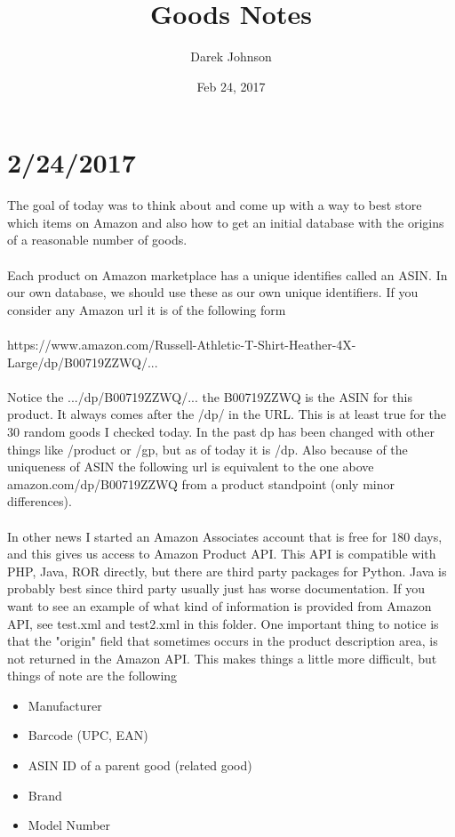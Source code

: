 \documentclass[12pt]{article}
\title{Goods Notes}
\author{Darek Johnson}
\date{Feb 24, 2017}
\begin{document}

\maketitle

\section*{2/24/2017}
The goal of today was to think about and come up with a way to best store which items on Amazon and also how to get an initial database with the origins of a reasonable number of goods. \\\\
Each product on Amazon marketplace has a unique identifies called an ASIN. In our own database, we should use these as our own unique identifiers. If you consider any Amazon url it is of the following form\\\\
https://www.amazon.com/Russell-Athletic-T-Shirt-Heather-4X-Large/dp/B00719ZZWQ/... \\\\
Notice the .../dp/B00719ZZWQ/... the B00719ZZWQ is the ASIN for this product. It always comes after the /dp/ in the URL. This is at least true for the 30 random goods I checked today. In the past dp has been changed with other things like /product or /gp, but as of today it is /dp. Also because of the uniqueness of ASIN the following url is equivalent to the one above amazon.com/dp/B00719ZZWQ from a product standpoint (only minor differences). \\\\
In other news I started an Amazon Associates account that is free for 180 days, and this gives us access to Amazon Product API. This API is compatible with PHP, Java, ROR directly, but there are third party packages for Python. Java is probably best since third party usually just has worse documentation. If you want to see an example of what kind of information is provided from Amazon API, see test.xml and test2.xml in this folder. One important thing to notice is that the "origin" field that sometimes occurs in the product description area, is not returned in the Amazon API. This makes things a little more difficult, but things of note are the following

\begin{itemize}
	\item Manufacturer 
	\item Barcode (UPC, EAN)
	\item ASIN ID of a parent good (related good)
	\item Brand 
	\item Model Number
\end{itemize}
\end{document}
